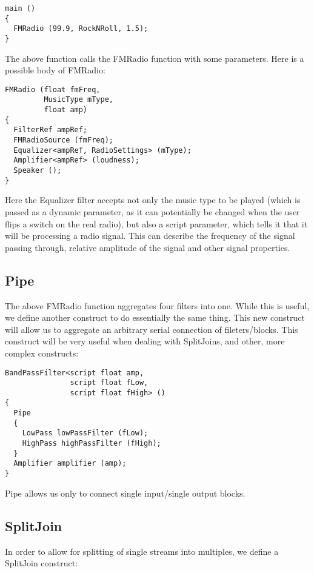 \documentclass[twocolumn, draft]{article}
\begin{document}
\begin{verbatim}
main ()
{
  FMRadio (99.9, RockNRoll, 1.5);
}
\end{verbatim}

The above function calls the FMRadio function with some parameters.
Here is a possible body of FMRadio:

\begin{verbatim}
FMRadio (float fmFreq,
         MusicType mType,
         float amp)
{
  FilterRef ampRef;
  FMRadioSource (fmFreq);
  Equalizer<ampRef, RadioSettings> (mType);
  Amplifier<ampRef> (loudness);
  Speaker ();
}
\end{verbatim}

Here the Equalizer filter accepts not only the music type to be played
(which is passed as a dynamic parameter, as it can potentially be
changed when the user flips a switch on the real radio), but also
a script parameter, which tells it that it will be processing a radio
signal.  This can describe the frequency of the signal passing through,
relative amplitude of the signal and other signal properties.

\subsection{Pipe}

The above FMRadio function aggregates four filters into one.  While this is
useful, we define another construct to do essentially the same thing.
This new construct will
allow us to aggregate an arbitrary serial connection of fileters/blocks.
This construct will be very useful when dealing with SplitJoins, 
and other, more complex constructs:

\begin{verbatim}
BandPassFilter<script float amp, 
               script float fLow, 
               script float fHigh> ()
{
  Pipe
  {
    LowPass lowPassFilter (fLow);
    HighPass highPassFilter (fHigh);
  } 
  Amplifier amplifier (amp);
}
\end{verbatim}

Pipe allows us only to connect single input/single output blocks.

\subsection{SplitJoin}

In order to allow for splitting of single streams into multiples,
we define a SplitJoin construct:
\end{document}
